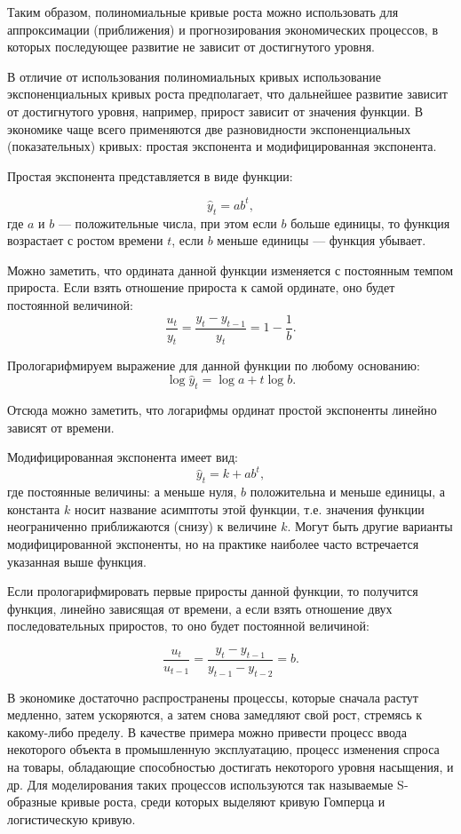 Таким образом, полиномиальные кривые роста можно использовать для аппроксимации (приближения) и прогнозирования экономических процессов, в которых последующее развитие не зависит от достигнутого уровня.

В отличие от использования полиномиальных кривых использование экспоненциальных кривых роста предполагает, что дальнейшее развитие зависит от достигнутого уровня, например, прирост зависит от значения функции. В экономике чаще всего применяются две разновидности экспоненциальных (показательных) кривых: простая экспонента и модифицированная экспонента.

Простая экспонента представляется в виде функции:

\[\hat{y}_t=ab^t, \]
где $a$ и $b$ --- положительные числа, при этом если $b$ больше единицы, то функция возрастает с ростом времени $t$, если $b$ меньше единицы --- функция убывает.

Можно заметить, что ордината данной функции изменяется с постоянным темпом прироста. Если взять отношение прироста к самой ординате, оно будет постоянной величиной:
\[ \dfrac{u_t}{y_t} = \dfrac{y_t - y_{t-1}}{y_t} = 1 - \dfrac{1}{b}. \]

Прологарифмируем выражение для данной функции по любому основанию:
\[ \log \hat{y}_t = \log a + t \log b. \]

Отсюда можно заметить, что логарифмы ординат простой экспоненты линейно зависят от времени.

Модифицированная экспонента имеет вид:
\[ \hat{y}_t = k + ab^t, \]
где постоянные величины: $а$ меньше нуля, $ b $ положительна и меньше единицы, а константа $ k $ носит название асимптоты этой функции, т.е. значения функции неограниченно приближаются (снизу) к величине $ k $. Могут быть другие варианты модифицированной экспоненты, но на практике наиболее часто встречается указанная выше функция.

Если прологарифмировать первые приросты данной функции, то получится функция, линейно зависящая от времени, а если взять отношение двух последовательных приростов, то оно будет постоянной величиной:

\[ \dfrac{u_t}{u_{t-1}} = \dfrac{y_t - y_{t-1}}{y_{t-1} - y_{t-2}} = b. \]

В экономике достаточно распространены процессы, которые сначала растут медленно, затем ускоряются, а затем снова замедляют свой рост, стремясь к какому-либо пределу. В качестве примера можно привести процесс ввода некоторого объекта в промышленную эксплуатацию, процесс изменения спроса на товары, обладающие способностью достигать некоторого уровня насыщения, и др. Для моделирования таких процессов используются так называемые S-образные кривые роста, среди которых выделяют кривую Гомперца и логистическую кривую.

